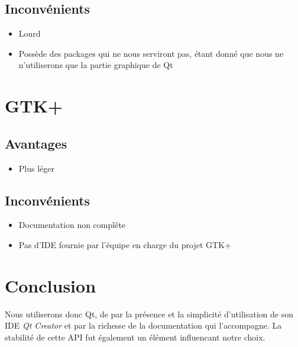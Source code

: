 \documentclass[a4paper]{report}
\begin{document}
\subsection{Inconvénients}
\begin{itemize}
    \item Lourd
    \item Possède des packages qui ne nous serviront pas, étant donné que nous ne n'utiliserons que la partie graphique de Qt
\end{itemize}
\section{GTK+}
\subsection{Avantages}
\begin{itemize}
    \item Plus léger
\end{itemize}
\subsection{Inconvénients}
\begin{itemize}
    \item Documentation non complête
    \item Pas d'IDE fournie par l'équipe en charge du projet GTK+
\end{itemize}
\section{Conclusion}
Nous utiliserons donc Qt, de par la présence et la simplicité d'utilisation de son IDE \textit{Qt Creator} et par la richesse de la documentation qui l'accompagne. La stabilité de cette API fut également un élément influencant notre choix.


\printindex
\listoffigures
\end{document}
